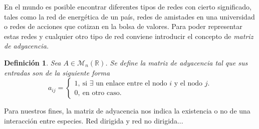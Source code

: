 \documentclass[11pt,a4paper]{article}
\begin{document}
En el mundo es posible encontrar diferentes tipos de redes con cierto significado, tales como la red de energética de un país, redes de amistades en una universidad o redes de acciones que cotizan en la bolsa de valores. Para poder representar estas redes y cualquier otro tipo de red conviene introducir el concepto de \textit{matriz de adyacencia.}
\newtheorem{defin1}{Definición}
\begin{defin1}
	Sea $A\in\mathcal{M}_n(\mathbb{R}) $. Se define la matriz de adyacencia tal que sus entradas son de la siguiente forma
	$$a_{ij}= 
	\begin{cases}
		1, \ \text{si $\exists$ un enlace entre el nodo $i$ y el nodo $j$.}\\
		0, \ \text{en otro caso}.
	\end{cases}$$
\end{defin1}
Para nuestros fines, la matriz de adyacencia nos indica la existencia o no de una interacción entre especies. Red dirigida y red no dirigida...


 
\end{document}

